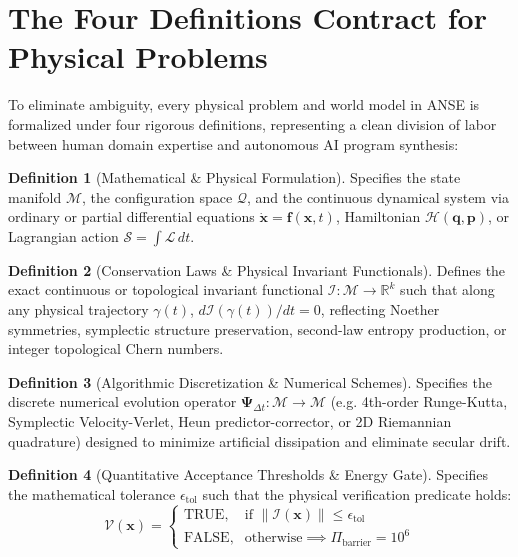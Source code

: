 \documentclass[10pt,journal,compsoc]{IEEEtran}
\theoremstyle{definition}
\newtheorem{definition}{Definition}
\begin{document}
\section{The Four Definitions Contract for Physical Problems}
To eliminate ambiguity, every physical problem and world model in ANSE is formalized under four rigorous definitions, representing a clean division of labor between human domain expertise and autonomous AI program synthesis:

\begin{definition}[Mathematical \& Physical Formulation]
Specifies the state manifold $\mathcal{M}$, the configuration space $\mathcal{Q}$, and the continuous dynamical system via ordinary or partial differential equations $\dot{\mathbf{x}} = \mathbf{f}(\mathbf{x}, t)$, Hamiltonian $\mathcal{H}(\mathbf{q}, \mathbf{p})$, or Lagrangian action $\mathcal{S} = \int \mathcal{L} \, dt$.
\end{definition}

\begin{definition}[Conservation Laws \& Physical Invariant Functionals]
Defines the exact continuous or topological invariant functional $\mathcal{I}: \mathcal{M} \to \mathbb{R}^k$ such that along any physical trajectory $\gamma(t)$, $d\mathcal{I}(\gamma(t))/dt = 0$, reflecting Noether symmetries, symplectic structure preservation, second-law entropy production, or integer topological Chern numbers.
\end{definition}

\begin{definition}[Algorithmic Discretization \& Numerical Schemes]
Specifies the discrete numerical evolution operator $\mathbf{\Psi}_{\Delta t}: \mathcal{M} \to \mathcal{M}$ (e.g. 4th-order Runge-Kutta, Symplectic Velocity-Verlet, Heun predictor-corrector, or 2D Riemannian quadrature) designed to minimize artificial dissipation and eliminate secular drift.
\end{definition}

\begin{definition}[Quantitative Acceptance Thresholds \& Energy Gate]
Specifies the mathematical tolerance $\epsilon_{\text{tol}}$ such that the physical verification predicate holds:
\begin{equation}
\mathcal{V}(\mathbf{x}) = \begin{cases} 
\text{TRUE}, & \text{if } \|\mathcal{I}(\mathbf{x})\| \le \epsilon_{\text{tol}} \\
\text{FALSE}, & \text{otherwise} \implies \Pi_{\text{barrier}} = 10^6
\end{cases}
\end{equation}
\end{definition}
\end{document}
